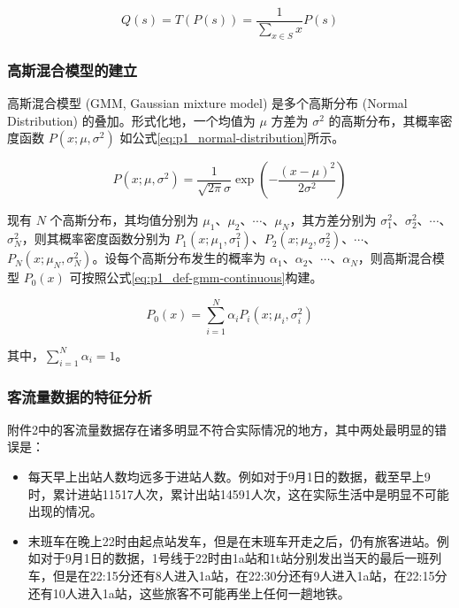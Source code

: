 \documentclass[12pt,a4paper]{mcmthesis}
\begin{document}
    \begin{equation}
        Q(s) = T(P(s)) = \frac{1}{\sum_{x \in S} x} P(s)
        \label{eq:p1_def-map-disperse}
    \end{equation}

    \subsubsection{高斯混合模型的建立}

    高斯混合模型 (GMM, Gaussian mixture model) 是多个高斯分布 (Normal Distribution) 的叠加。形式化地，一个均值为 $\mu$ 方差为 $\sigma^2$ 的高斯分布，其概率密度函数 $P(x;\mu,\sigma^2)$ 如公式\ref{eq:p1_normal-distribution}所示。

    \begin{equation}
        P(x;\mu,\sigma^2) = \frac{1}{\sqrt{2\pi}\sigma} \exp \left( - \frac{(x-\mu)^2}{2\sigma^2} \right)
        \label{eq:p1_normal-distribution}
    \end{equation}

    现有 $N$ 个高斯分布，其均值分别为 $\mu_1$、$\mu_2$、$\cdots$、$\mu_N$，其方差分别为 $\sigma^2_1$、$\sigma^2_2$、$\cdots$、$\sigma^2_N$，则其概率密度函数分别为 $P_1(x;\mu_1,\sigma^2_1)$、$P_2(x;\mu_2,\sigma^2_2)$、$\cdots$、$P_N(x;\mu_N,\sigma^2_N)$。设每个高斯分布发生的概率为 $\alpha_1$、$\alpha_2$、$\cdots$、$\alpha_N$，则高斯混合模型 $P_0(x)$ 可按照公式\ref{eq:p1_def-gmm-continuous}构建。

    \begin{equation}
        P_0(x) = \sum_{i=1}^{N} \alpha_i P_i(x;\mu_i,\sigma^2_i)
        \label{eq:p1_def-gmm-continuous}
    \end{equation}

    其中，$\sum_{i=1}^{N} \alpha_i=1$。

    \subsubsection{客流量数据的特征分析}

    附件2中的客流量数据存在诸多明显不符合实际情况的地方，其中两处最明显的错误是：

    \begin{itemize}
        \item 每天早上出站人数均远多于进站人数。例如对于9月1日的数据，截至早上9时，累计进站11517人次，累计出站14591人次，这在实际生活中是明显不可能出现的情况。
        \item 末班车在晚上22时由起点站发车，但是在末班车开走之后，仍有旅客进站。例如对于9月1日的数据，1号线于22时由1a站和1t站分别发出当天的最后一班列车，但是在22:15分还有8人进入1a站，在22:30分还有9人进入1a站，在22:15分还有10人进入1a站，这些旅客不可能再坐上任何一趟地铁。
    \end{itemize}
\end{document}
